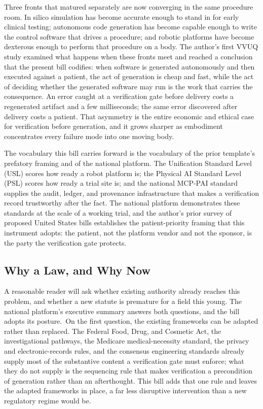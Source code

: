 Three fronts that matured separately are now converging in the same procedure
room. In silico simulation has become accurate enough to stand in for early
clinical testing; autonomous code generation has become capable enough to write
the control software that drives a procedure; and robotic platforms have become
dexterous enough to perform that procedure on a body. The author's first VVUQ
study \cite{kawchak2026vvuq01} examined what happens when these fronts meet and
reached a conclusion that the present bill codifies: when software is generated
autonomously and then executed against a patient, the act of generation is cheap
and fast, while the act of deciding whether the generated software may run is the
work that carries the consequence. An error caught at a verification gate before
delivery costs a regenerated artifact and a few milliseconds; the same error
discovered after delivery costs a patient. That asymmetry is the entire economic
and ethical case for verification before generation, and it grows sharper as
embodiment concentrates every failure mode into one moving body.

The vocabulary this bill carries forward is the vocabulary of the prior
template's prefatory framing and of the national platform. The Unification
Standard Level (USL) scores how ready a robot platform is; the Physical AI
Standard Level (PSL) scores how ready a trial site is; and the national MCP-PAI
standard supplies the audit, ledger, and provenance infrastructure that makes a
verification record trustworthy after the fact. The national platform
\cite{kawchak2026national} demonstrates these standards at the scale of a working
trial, and the author's prior survey of proposed United States bills
\cite{kawchak2026bills} establishes the patient-priority framing that this
instrument adopts: the patient, not the platform vendor and not the sponsor, is
the party the verification gate protects.

\subsection{Why a Law, and Why Now}

A reasonable reader will ask whether existing authority already reaches this
problem, and whether a new statute is premature for a field this young. The
national platform's executive summary answers both questions, and the bill adopts
its posture.\ On the first question, the existing frameworks can be adapted rather
than replaced. The Federal Food, Drug, and Cosmetic Act, the investigational
pathways, the Medicare medical-necessity standard, the privacy and
electronic-records rules, and the consensus engineering standards already supply
most of the substantive content a verification gate must enforce; what they do
not supply is the sequencing rule that makes verification a precondition of
generation rather than an afterthought. This bill adds that one rule and leaves
the adapted frameworks in place, a far less disruptive intervention than a new
regulatory regime would be.


